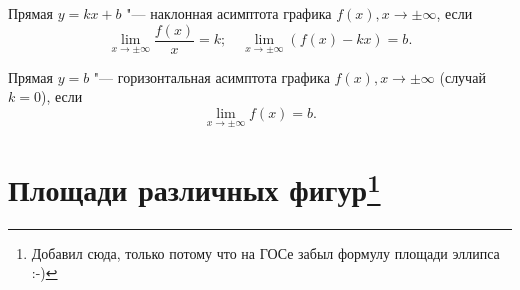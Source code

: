 \textbullet \quad
Прямая $y=kx+b$ "--- наклонная асимптота графика $f(x), x\to\pm\infty$, если $$\lim\limits_{x\to\pm\infty}\frac{f(x)}{x}=k; \quad \lim\limits_{x\to\pm\infty} (f(x)-kx)=b.$$

\textbullet \quad
Прямая $y=b$ "--- горизонтальная асимптота графика $f(x), x\to\pm\infty$ (случай $k=0$), если $$ \lim\limits_{x\to\pm\infty} f(x)=b.$$

\resetHeadWidth
\section[Площади различных фигур]{Площади различных фигур\footnote{Добавил сюда, только потому что на ГОСе забыл формулу площади эллипса :-)}}
\setlength\LTleft{-1cm}
\setlength\LTright{-1cm}
